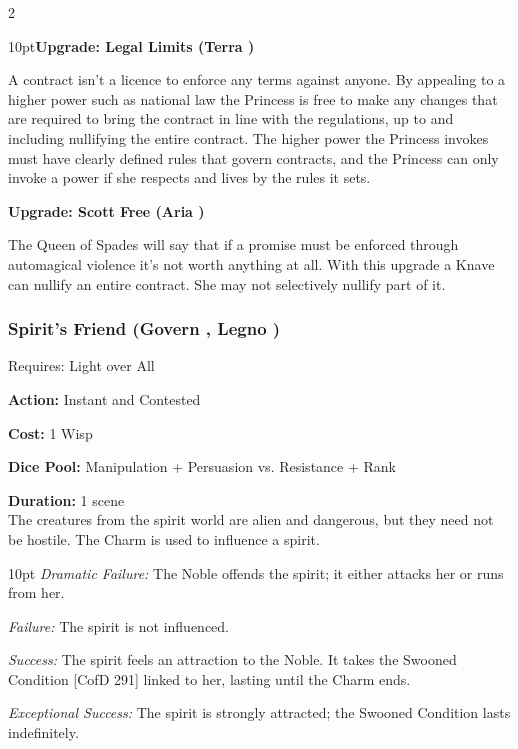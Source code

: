 \begin{multicols}{2}
\begin{myindentpar}{10pt}\textbf{Upgrade: Legal Limits (Terra \textbullet\textbullet\textbullet)}

A contract isn't a licence to enforce any terms against anyone. By appealing to a higher power such as national law the Princess is free to make any changes that are required to bring the contract in line with the regulations, up to and including nullifying the entire contract. The higher power the Princess invokes must have clearly defined rules that govern contracts, and the Princess can only invoke a power if she respects and lives by the rules it sets.

\textbf{Upgrade: Scott Free (Aria \textbullet\textbullet\textbullet)}

The Queen of Spades will say that if a promise must be enforced through automagical violence it's not worth anything at all. With this upgrade a Knave can nullify an entire contract. She may not selectively nullify part of it.\end{myindentpar}

\subsubsection*{Spirit's Friend (Govern \textbullet\textbullet\textbullet, Legno \textbullet\textbullet)}

\noindent Requires: Light over All

\noindent \textbf{Action:} Instant and Contested

\noindent \textbf{Cost:} 1 Wisp

\noindent \textbf{Dice Pool:} Manipulation + Persuasion vs. Resistance + Rank

\noindent \textbf{Duration:} 1 scene \\

\noindent The creatures from the spirit world are alien and dangerous, but they need not be hostile. The Charm is used to influence a spirit.

\begin{myindentpar}{10pt} \emph{Dramatic Failure:} The Noble offends the spirit; it either attacks her or runs from her.

\emph{Failure:} The spirit is not influenced.

\emph{Success:} The spirit feels an attraction to the Noble. It takes the Swooned Condition [CofD 291] linked to her, lasting until the Charm ends.

\emph{Exceptional Success:}	 The spirit is strongly attracted; the Swooned Condition lasts indefinitely.


\end{myindentpar}
\end{multicols}
